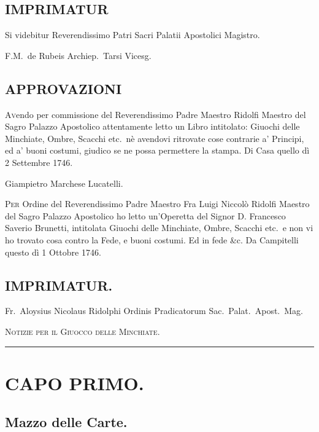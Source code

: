 \documentclass[11pt,a6paper]{article}
\newcommand{\supersection}[1]{%
\clearpage
    {\scshape \centering \huge #1\\}
    \vspace{6pt}
    \hrule
    \vspace{12pt}
}
\begin{document}
\subsection{IMPRIMATUR}

Si videbitur Reverendissimo Patri Sacri Palatii Apostolici Magistro.

\nopagebreak
\hfill F.M.\ de Rubeis Archiep.\ Tarsi Vicesg.

\subsection{APPROVAZIONI}

\lettrine{A}{v}endo per commissione del Reverendissimo
Padre Maestro Ridolfi Maestro del Sagro Palazzo Apostolico
attentamente letto un Libro intitolato:
Giuochi delle Minchiate, Ombre, Scacchi etc.\ nè
avendovi ritrovate cose contrarie a'
Principi, ed a' buoni costumi, giudico se ne possa
permettere la stampa. Di Casa quello dì
2 Settembre 1746.

\nopagebreak
\hfill Giampietro Marchese Lucatelli.

\lettrine{P}{er} Ordine del Reverendissimo Padre
Maestro Fra Luigi Niccolò Ridolfi Maestro
del Sagro Palazzo Apostolico ho letto
un'Operetta del Signor D. Francesco
Saverio Brunetti, intitolata Giuochi delle
Minchiate, Ombre, Scacchi etc.\ e non vi ho
trovato cosa contro la Fede, e buoni costumi.
Ed in fede \&c. Da Campitelli questo dì 1 Ottobre 1746.


\subsection{IMPRIMATUR.}
{\flushright Fr.\ Aloysius Nicolaus Ridolphi Ordinis Pradicatorum Sac.\ Palat.\ Apost.\ Mag.

}


\supersection{
Notizie
per il Giuocco
delle
Minchiate.}


\section{CAPO PRIMO.}


\subsection{Mazzo delle Carte.}
\end{document}
